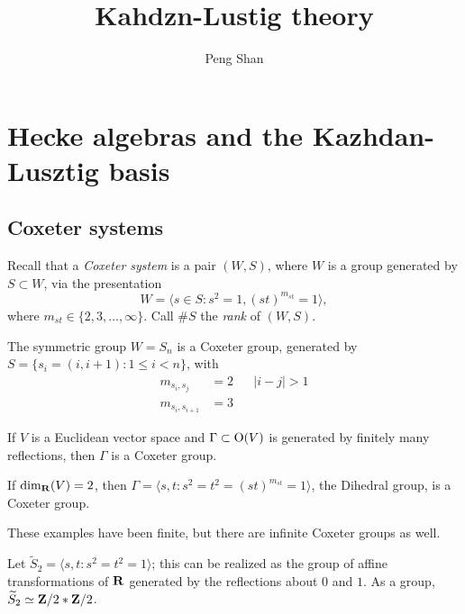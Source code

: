 \documentclass{article}
\title{Kahdzn-Lustig theory}
\author{Peng Shan}
\begin{document}
\maketitle





\section{Hecke algebras and the Kazhdan-Lusztig basis}


\subsection{Coxeter systems}

Recall that a \emph{Coxeter system} is a pair $(W,S)$, where $W$ is a group 
generated by $S\subset W$, via the presentation 
\[
  W = \langle s\in S:s^2 = 1, (s t)^{m_{s t}} = 1\rangle ,
\]
where $m_{s t}\in \{2,3,\ldots,\infty\}$. Call $\# S$ the \emph{rank} of 
$(W,S)$. 

\begin{example}
The symmetric group $W=S_n$ is a Coxeter group, generated by 
$S=\{s_i=(i, i+1):1\leqslant i<n\}$, with 
\begin{align*}
  m_{s_i,s_j} &= 2 && |i-j|>1 \\
  m_{s_i,s_{i+1}} &= 3 
\end{align*}
\end{example}

\begin{example}
If $V$ is a Euclidean vector space and 
$\Gamma\subset \operatorname{O}(V)$ is generated by finitely many reflections, then 
$\Gamma$ is a Coxeter group. 
\end{example}

\begin{example}
If $\dim_{\mathbf{R}}(V)=2$, then $\Gamma=\langle s,t:s^2=t^2=(s t)^{m_{s t}} = 1\rangle$, 
the Dihedral group, is a Coxeter group. 
\end{example}

These examples have been finite, but there are infinite Coxeter groups as well. 

\begin{example}
Let $\widetilde S_2=\langle s,t:s^2=t^2=1\rangle$; this can be realized as the 
group of affine transformations of $\mathbf{R}$ generated by the reflections about 
$0$ and $1$. As a group, $\widetilde S_2\simeq \mathbf{Z}/2\ast \mathbf{Z}/2$. 
\end{example}
\end{document}
